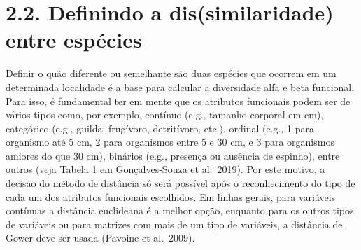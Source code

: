 \documentclass[
]{book}
\begin{document}
\hypertarget{definindo-a-dissimilaridade-entre-espuxe9cies}{%
\section{2.2. Definindo a dis(similaridade) entre espécies}\label{definindo-a-dissimilaridade-entre-espuxe9cies}}

Definir o quão diferente ou semelhante são duas espécies que ocorrem em um determinada localidade é a base para calcular a diversidade alfa e beta funcional. Para isso, é fundamental ter em mente que os atributos funcionais podem ser de vários tipos como, por exemplo, contínuo (e.g., tamanho corporal em cm), categórico (e.g., guilda: frugívoro, detritívoro, etc.), ordinal (e.g., 1 para organismo até 5 cm, 2 para organismos entre 5 e 30 cm, e 3 para organismos amiores do que 30 cm), binários (e.g., presença ou ausência de espinho), entre outros (veja Tabela 1 em Gonçalves-Souza et al.~2019). Por este motivo, a decisão do método de distância só será possível após o reconhecimento do tipo de cada um dos atributos funcionais escolhidos. Em linhas gerais, para variáveis contínuas a distância euclideana é a melhor opção, enquanto para os outros tipos de variáveis ou para matrizes com mais de um tipo de variáveis, a distância de Gower deve ser usada (Pavoine et al.~2009).
\end{document}
